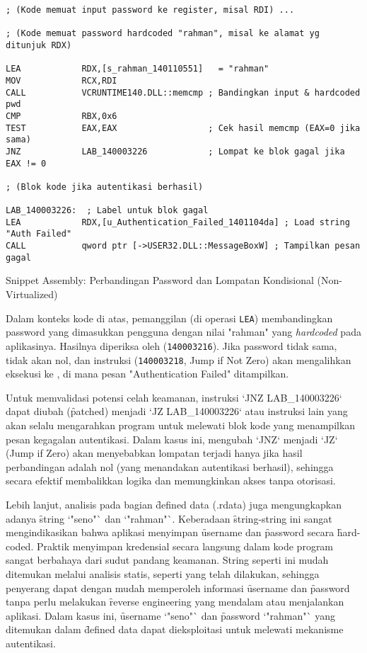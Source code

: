 \begin{listing}[H]
    \begin{verbatim}
; (Kode memuat input password ke register, misal RDI) ...

; (Kode memuat password hardcoded "rahman", misal ke alamat yg ditunjuk RDX)

LEA            RDX,[s_rahman_140110551]   = "rahman"
MOV            RCX,RDI
CALL           VCRUNTIME140.DLL::memcmp ; Bandingkan input & hardcoded pwd
CMP            RBX,0x6
TEST           EAX,EAX                  ; Cek hasil memcmp (EAX=0 jika sama)
JNZ            LAB_140003226            ; Lompat ke blok gagal jika EAX != 0

; (Blok kode jika autentikasi berhasil) 

LAB_140003226:  ; Label untuk blok gagal
LEA            RDX,[u_Authentication_Failed_1401104da] ; Load string "Auth Failed"
CALL           qword ptr [->USER32.DLL::MessageBoxW] ; Tampilkan pesan gagal

\end{verbatim}
\caption{Snippet Assembly: Perbandingan Password dan Lompatan Kondisional (Non-Virtualized)}
\label{lst:asm_static_nonvirt_snippet} %
\end{listing}

Dalam konteks kode di atas, pemanggilan  (di operasi \texttt{LEA}) membandingkan password yang dimasukkan pengguna dengan nilai "rahman" yang \textit{hardcoded} pada aplikasinya. Hasilnya diperiksa oleh  (\texttt{140003216}). Jika password tidak sama,  tidak akan nol, dan instruksi  (\texttt{140003218}, Jump if Not Zero) akan mengalihkan eksekusi ke , di mana pesan "Authentication Failed" ditampilkan. 

Untuk memvalidasi potensi celah keamanan, instruksi `JNZ LAB\_140003226` dapat diubah (\f{patched}) menjadi `JZ LAB\_140003226` atau instruksi lain yang akan selalu mengarahkan program untuk melewati blok kode yang menampilkan pesan kegagalan autentikasi. Dalam kasus ini, mengubah `JNZ` menjadi `JZ` (Jump if Zero) akan menyebabkan lompatan terjadi hanya jika hasil perbandingan adalah nol (yang menandakan autentikasi berhasil), sehingga secara efektif membalikkan logika dan memungkinkan akses tanpa otorisasi.

Lebih lanjut, analisis pada bagian \f{defined data} (.rdata) juga mengungkapkan adanya \f{string} `"seno"` dan `"rahman"`. Keberadaan \f{string-string} ini sangat mengindikasikan bahwa aplikasi menyimpan \f{username} dan \f{password} secara \f{hard-coded}. Praktik menyimpan kredensial secara langsung dalam kode program sangat berbahaya dari sudut pandang keamanan. String seperti ini mudah ditemukan melalui analisis statis, seperti yang telah dilakukan, sehingga penyerang dapat dengan mudah memperoleh informasi \f{username} dan \f{password} tanpa perlu melakukan \f{reverse engineering} yang mendalam atau menjalankan aplikasi. Dalam kasus ini, \f{username} `"seno"` dan \f{password} `"rahman"` yang ditemukan dalam \f{defined data} dapat dieksploitasi untuk melewati mekanisme autentikasi.

